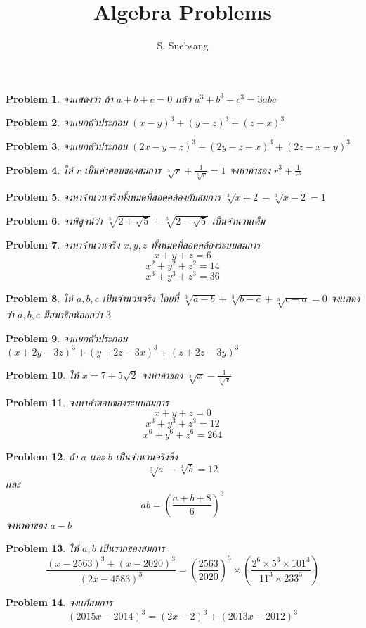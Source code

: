 \documentclass[a4paper,12pt]{article}
\author{S. Suebsang}
\title{\textbf{Algebra Problems}}
\newtheorem{problem}{Problem}
\begin{document}
	
	
	\maketitle
	
	
	
	
	\begin{problem}
		จงเเสดงว่า ถ้า $a+b+c=0$ เเล้ว $a^3+b^3+c^3=3abc$
	\end{problem}
	\begin{problem}
		จงเเยกตัวประกอบ $(x-y)^3+(y-z)^3+(z-x)^3$
	\end{problem}
	\begin{problem}
		จงเเยกตัวประกอบ $(2x-y-z)^3+(2y-z-x)^3+(2z-x-y)^3$
	\end{problem}
	\begin{problem}
		ให้ $r$  เป็นคำตอบของสมการ $\sqrt[3]{r}+\frac{1}{\sqrt[3]{r}}=1$ จงหาค่าของ $r^3+\frac{1}{r^3}$
	\end{problem}
	\begin{problem}
		จงหาจำนวนจริงทั้งหมดที่สอดคล้องกับสมการ $\sqrt[3]{x+2}-\sqrt[3]{x-2}=1$
	\end{problem}
	\begin{problem}
		จงพิสูจน์ว่า $\sqrt[3]{2+\sqrt{5}}+\sqrt[3]{2-\sqrt{5}}$ เป็นจำนวนเต็ม
	\end{problem}
	\begin{problem}
		จงหาจำนวนจริง $x,y,z$ ทั้งหมดที่สอดคล้องระบบสมการ
		$$x+y+z=6$$
		$$x^2+y^2+z^2=14$$
		$$x^3+y^3+z^3=36$$
	\end{problem}
	\begin{problem}
		ให้ $a,b,c$ เป็นจำนวนจริง โดยที่ $\sqrt[3]{a-b}+\sqrt[3]{b-c}+\sqrt[3]{c-a}=0$ จงเเสดงว่า ${a,b,c}$ มีสมาชิกน้อยกว่า $3$
	\end{problem}
	\begin{problem}
		จงเเยกตัวประกอบ $(x+2y-3z)^3+(y+2z-3x)^3+(z+2z-3y)^3$
	\end{problem}
	\begin{problem}
		ให้ $x=7+5\sqrt{2}$ จงหาค่าของ $\sqrt[3]{x}-\frac{1}{\sqrt[3]{x}}$
	\end{problem}
	\begin{problem}
		จงหาคำตอบของระบบสมการ 
		$$x+y+z=0$$
		$$x^3+y^3+z^3=12$$
		$$x^6+y^6+z^6=264$$
	\end{problem}
	\begin{problem}
		ถ้า $a$ เเละ $b$ เป็นจำนวนจริงซึ่ง $$\sqrt[3]{a}-\sqrt[3]{b}=12$$ เเละ $$ab=(\frac{a+b+8}{6})^3$$ จงหาค่าของ $a-b$
	\end{problem}
	\begin{problem}
		ให้ $a,b$ เป็นรากของสมการ 
		$$\frac{(x-2563)^3+(x-2020)^3}{(2x-4583)^3}=(\frac{2563}{2020})^3\times(\frac{2^6\times{5^3}\times{101^3}}{11^3\times{233^3}})$$
	\end{problem}
	\begin{problem}
		จงเเก้สมการ
		$$(2015x-2014)^3=(2x-2)^3+(2013x-2012)^3$$
	\end{problem}
\end{document}
